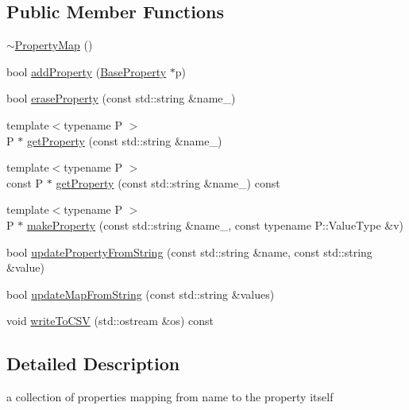 \subsection*{Public Member Functions}
\begin{DoxyCompactItemize}
\item 
\mbox{\hyperlink{classg2o_1_1_property_map_a0b7213999ad4ea636ffeda176cb92b52}{$\sim$\+Property\+Map}} ()
\item 
bool \mbox{\hyperlink{classg2o_1_1_property_map_a6b90b5cfd16125c174e140af6e40dad9}{add\+Property}} (\mbox{\hyperlink{classg2o_1_1_base_property}{Base\+Property}} $\ast$p)
\item 
bool \mbox{\hyperlink{classg2o_1_1_property_map_a8f96ea923fe711a0ffa6e4c6479945d9}{erase\+Property}} (const std\+::string \&name\+\_\+)
\item 
{\footnotesize template$<$typename P $>$ }\\P $\ast$ \mbox{\hyperlink{classg2o_1_1_property_map_ab3a37fb6f8358f3c63a13678349f1f82}{get\+Property}} (const std\+::string \&name\+\_\+)
\item 
{\footnotesize template$<$typename P $>$ }\\const P $\ast$ \mbox{\hyperlink{classg2o_1_1_property_map_a9b09845c08bdfb682a13516d4eacd452}{get\+Property}} (const std\+::string \&name\+\_\+) const
\item 
{\footnotesize template$<$typename P $>$ }\\P $\ast$ \mbox{\hyperlink{classg2o_1_1_property_map_add6e602dcd651b8883c30c350d23692f}{make\+Property}} (const std\+::string \&name\+\_\+, const typename P\+::\+Value\+Type \&v)
\item 
bool \mbox{\hyperlink{classg2o_1_1_property_map_a43df66ba15f9425abbd0e888a7b67251}{update\+Property\+From\+String}} (const std\+::string \&name, const std\+::string \&value)
\item 
bool \mbox{\hyperlink{classg2o_1_1_property_map_a0407e6a72afafd608f13cfdffc6ffc06}{update\+Map\+From\+String}} (const std\+::string \&values)
\item 
void \mbox{\hyperlink{classg2o_1_1_property_map_aa4ad984887fe56189f7e214f9760f161}{write\+To\+C\+SV}} (std\+::ostream \&os) const
\end{DoxyCompactItemize}


\subsection{Detailed Description}
a collection of properties mapping from name to the property itself 

